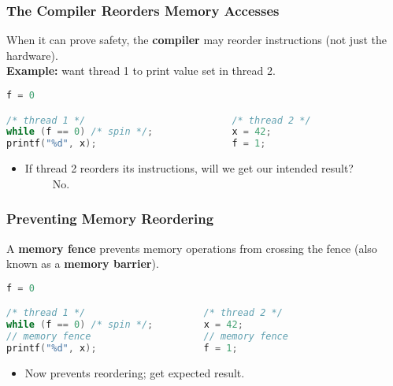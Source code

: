 \begin{frame}[fragile]
  \frametitle{The Compiler Reorders Memory Accesses}

  
  When it can prove safety, the {\bf compiler} may reorder instructions (not just the hardware).\\[1em]

  {\bf Example:} want thread 1 to print value set in thread 2.

  \begin{lstlisting}[language=C]
                            f = 0

/* thread 1 */                          /* thread 2 */
while (f == 0) /* spin */;              x = 42;
printf("%d", x);                        f = 1;
  \end{lstlisting}

  \begin{itemize}
    \item If thread 2 reorders its instructions, will we get our intended
      result?\\[1em]
     \alert{~~~~~No.}
  \end{itemize}
  
\end{frame}

\begin{frame}[fragile]
  \frametitle{Preventing Memory Reordering}

  
     A {\bf memory fence} prevents memory operations from crossing the
      fence (also known as a {\bf memory barrier}).

  \begin{lstlisting}[language=C]
                         f = 0

/* thread 1 */                     /* thread 2 */
while (f == 0) /* spin */;         x = 42;
// memory fence                    // memory fence
printf("%d", x);                   f = 1;
  \end{lstlisting}

  \begin{itemize}
    \item Now prevents reordering; get expected result.
  \end{itemize}
  

\end{frame}

